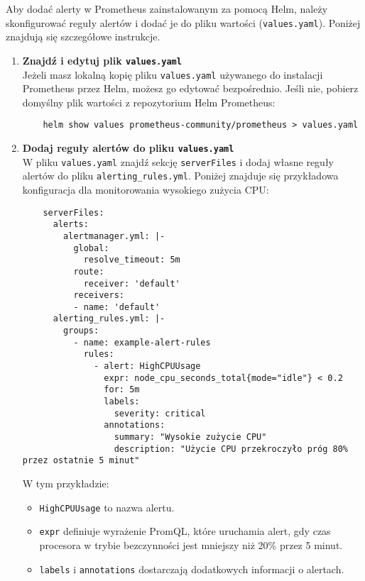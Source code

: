 \documentclass{article}
\begin{document}
Aby dodać alerty w Prometheus zainstalowanym za pomocą Helm, należy skonfigurować reguły alertów i dodać je do pliku wartości (\texttt{values.yaml}). Poniżej znajdują się szczegółowe instrukcje.

\begin{enumerate}
    \item \textbf{Znajdź i edytuj plik \texttt{values.yaml}} \\
    Jeżeli masz lokalną kopię pliku \texttt{values.yaml} używanego do instalacji Prometheus przez Helm, możesz go edytować bezpośrednio. Jeśli nie, pobierz domyślny plik wartości z repozytorium Helm Prometheus:
    \begin{lstlisting}
    helm show values prometheus-community/prometheus > values.yaml
    \end{lstlisting}

    \item \textbf{Dodaj reguły alertów do pliku \texttt{values.yaml}} \\
    W pliku \texttt{values.yaml} znajdź sekcję \texttt{serverFiles} i dodaj własne reguły alertów do pliku \texttt{alerting\_rules.yml}. Poniżej znajduje się przykładowa konfiguracja dla monitorowania wysokiego zużycia CPU:
    \begin{lstlisting}
    serverFiles:
      alerts:
        alertmanager.yml: |-
          global:
            resolve_timeout: 5m
          route:
            receiver: 'default'
          receivers:
          - name: 'default'
      alerting_rules.yml: |-
        groups:
          - name: example-alert-rules
            rules:
              - alert: HighCPUUsage
                expr: node_cpu_seconds_total{mode="idle"} < 0.2
                for: 5m
                labels:
                  severity: critical
                annotations:
                  summary: "Wysokie zużycie CPU"
                  description: "Użycie CPU przekroczyło próg 80% przez ostatnie 5 minut"
    \end{lstlisting}
    
    W tym przykładzie:
    \begin{itemize}
        \item \texttt{HighCPUUsage} to nazwa alertu.
        \item \texttt{expr} definiuje wyrażenie PromQL, które uruchamia alert, gdy czas procesora w trybie bezczynności jest mniejszy niż 20\% przez 5 minut.
        \item \texttt{labels} i \texttt{annotations} dostarczają dodatkowych informacji o alertach.
    \end{itemize}


\end{enumerate}
\end{document}
